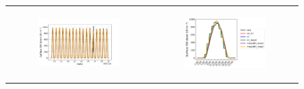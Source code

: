\begin{figure}[hbtp]
    \centering
    \begin{tabular}{cc}
        \begin{subfigure}[t]{0.5\textwidth}
            \caption{}
            \includegraphics[width=\textwidth]{images/chap5/SOP_TS_DC/time_series_cendrosa_SWdnSFC.png}
        \end{subfigure} &
        \begin{subfigure}[t]{0.5\textwidth}
            \caption{}
            \includegraphics[width=\textwidth]{images/chap5/SOP_TS_DC/diurnal_cycle_cendrosa_SWdnSFC.png}
        \end{subfigure} \\
        

\end{tabular}
\end{figure}
